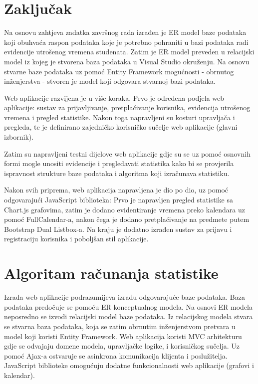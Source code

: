 \documentclass[times, utf8, zavrsni]{fer}
\begin{document}
\chapter{Zaključak}
Na osnovu zahtjeva zadatka završnog rada izrađen je ER model baze podataka koji obuhvaća raspon podataka koje je potrebno pohraniti u bazi podataka radi evidencije utrošenog vremena studenata. Zatim je ER model preveden u relacijski model iz kojeg je stvorena baza podataka u Visual Studio okruženju. Na osnovu stvarne baze podataka uz pomoć Entity Framework mogućnosti - obrnutog inženjerstva - stvoren je model koji odgovara stvarnoj bazi podataka.

Web aplikacije razvijena je u više koraka. Prvo je određena podjela web aplikacije: sustav za prijavljivanje, pretplaćivanje korisnika, evidencija utrošenog vremena i pregled statistike. Nakon toga napravljeni su kosturi upravljača i pregleda, te je definirano zajedničko korisničko sučelje web aplikacije (glavni izbornik).

Zatim su napravljeni testni dijelove web aplikacije gdje su se uz pomoć osnovnih formi mogle unositi evidencije i pregledavati statistika kako bi se provjerila ispravnost strukture baze podataka i algoritma koji izračunava statistiku. 

Nakon svih priprema, web aplikacija napravljena je dio po dio, uz pomoć odgovarajući JavaScript biblioteka:
Prvo je napravljen pregled statistike sa Chart.js grafovima, zatim je dodano evidentiranje vremena preko kalendara uz pomoć FullCalendar-a, nakon čega je dodano pretplaćivanje na predmete putem Bootstrap Dual Listbox-a. Na kraju je dodatno izrađen sustav za prijavu i registraciju korisnika i poboljšan stil aplikacije.




\appendix
\chapter{Algoritam računanja statistike}
\lstset{style=csharp, numbers=left}


\begin{sazetak}

Izrada web aplikacije podrazumijeva izradu odgovarajuće baze podataka. Baza podataka predočuje se pomoću ER konceptualnog modela. Na osnovi ER modela neposredno se izvodi relacijski model baze podataka. Iz relacijskog modela stvara se stvarna baza podataka, koja se zatim obrnutim inženjerstvom pretvara u model koji koristi Entity Framework. Web aplikacija koristi MVC arhitekturu gdje se odvajaju domene modela, upravljačke logike, i korisničkog sučelja. Uz pomoć Ajax-a ostvaruje se asinkrona komunikacija klijenta i poslužitelja. JavaScript biblioteke omogućuju dodatne funkcionalnosti web aplikacije (grafovi i kalendar).

\end{sazetak}
\end{document}
